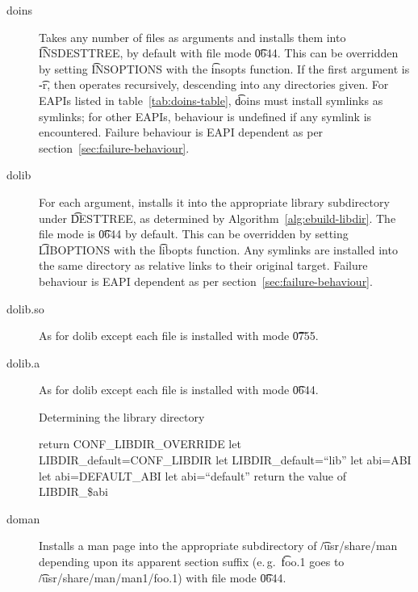 \begin{description}
\item[doins]  Takes any number of files as arguments and installs them into
    \t{INSDESTTREE}, by default with file mode \t{0644}. This can be overridden by setting
    \t{INSOPTIONS} with the \t{insopts} function. If the first argument is \t{-r}, then operates
    recursively, descending into any directories given. For EAPIs listed in
    table~\ref{tab:doins-table}, \t{doins} must install symlinks as symlinks;
    for other EAPIs, behaviour is undefined if any symlink is encountered. Failure
    behaviour is EAPI dependent as per section~\ref{sec:failure-behaviour}.

\item[dolib] For each argument, installs it into the appropriate library subdirectory under
    \t{DESTTREE}, as determined by Algorithm~\ref{alg:ebuild-libdir}. The file mode is \t{0644}
    by default. This can be overridden by setting \t{LIBOPTIONS} with the \t{libopts} function.
    Any symlinks are installed into the same directory as relative links to their original target.
    Failure behaviour is EAPI dependent as per section~\ref{sec:failure-behaviour}.

\item[dolib.so] As for dolib except each file is installed with mode \t{0755}.

\item[dolib.a] As for dolib except each file is installed with mode \t{0644}.

\begin{algorithm}
\caption{Determining the library directory} \label{alg:ebuild-libdir}
\begin{algorithmic}[1]
    \STATE return CONF\_LIBDIR\_OVERRIDE
\ENDIF
{}
    \STATE let LIBDIR\_default=CONF\_LIBDIR
\ELSE
    \STATE let LIBDIR\_default=``lib''
\ENDIF
{}
    \STATE let abi=ABI
    \STATE let abi=DEFAULT\_ABI
\ELSE
    \STATE let abi=``default''
\ENDIF
\STATE return the value of LIBDIR\_\$abi
\end{algorithmic}
\end{algorithm}

\item[doman] Installs a man page into the appropriate subdirectory of \t{/usr/share/man} depending
    upon its apparent section suffix (e.\,g.\ \t{foo.1} goes to \t{/usr/share/man/man1/foo.1}) with
    file mode \t{0644}.


\end{description}
